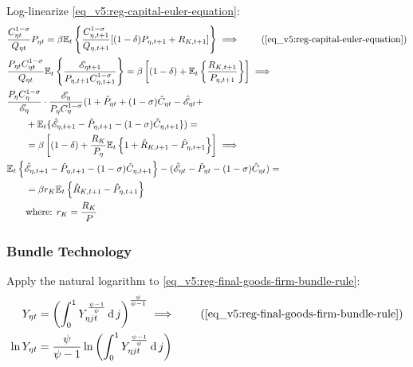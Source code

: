 \documentclass[../thesis.tex]{subfiles}
\begin{document}
Log-linearize \ref{eq_v5:reg-capital-euler-equation}:
	\begin{alignat}{2}
		& \frac{ C_{\eta t}^{1-\sigma}}{Q_{\eta t}} P_{\eta t} = \beta \mathbb{E}_t \left\{ \frac{ C_{\eta, t+1}^{1-\sigma}}{Q_{\eta, t+1}} [(1-\delta) P_{\eta, t+1} + R_{K,t+1}] \right\} \implies \tag{\ref{eq_v5:reg-capital-euler-equation}} \\
		& \frac{P_{\eta t} C_{\eta t}^{1-\sigma}}{Q_{\eta t}} \mathbb{E}_t \left\{ \frac{\te[t+1]}{P_{\eta, t+1} C_{\eta, t+1}^{1-\sigma}} \right\} = \beta \left[ (1-\delta) + \mathbb{E}_t \left\{ \frac{R_{K,t+1}}{P_{\eta, t+1}} \right\} \right] \implies \nonumber \\
		& \frac{P_{\eta} C_{\eta}^{1-\sigma}}{\te[]} \cdot \frac{\te[]}{P_{\eta} C_{\eta}^{1-\sigma}} (1 + \hat{P}_{\eta t} + (1 -\sigma) \hat{C}_{\eta t} - \hat{\mathscr{E}}_{\eta t} + \nonumber \\ 
		& \qquad + \E \{\hat{\mathscr{E}}_{\eta, t+1} - \hat{P}_{\eta, t+1} - (1 -\sigma) \hat{C}_{\eta, t+1}\}) = \nonumber \\
		& \qquad = \beta \left[ (1-\delta) + \frac{R_{K}}{P_{\eta}} \mathbb{E}_t \left\{ 1 + \hat{R}_{K, t+1} -\hat{P}_{\eta, t+1} \right\} \right] \implies \nonumber \\
		& \E \left\{ \hat{\mathscr{E}}_{\eta, t+1} - \hat{P}_{\eta, t+1}  - (1 -\sigma) \hat{C}_{\eta, t+1} \right\} - (\hat{\mathscr{E}}_{\eta t} - \hat{P}_{\eta t} - (1 -\sigma) \hat{C}_{\eta t}) = \nonumber \\
		& \qquad = \beta r_{K} \mathbb{E}_t \left\{ \hat{R}_{K, t+1} - \hat{P}_{\eta, t+1} \right\} \label{eq_v5:reg-ll-capital-euler-equation} \\
		& \qquad \text{where: } r_{K} = \frac{R_{K}}{P_{}} \label{eq_v5:reg-rk}
	\end{alignat}
	

	\subsubsection*{Bundle Technology}

Apply the natural logarithm to \ref{eq_v5:reg-final-goods-firm-bundle-rule}:
\begin{align}
	Y_{\eta t} &= \left( \int_{0}^{1} Y_{\eta jt}^{\frac{\psi-1}{\psi}} \dif j \right)^{\frac{\psi}{\psi-1}} \implies  \tag{\ref{eq_v5:reg-final-goods-firm-bundle-rule}} \\
	\ln{Y_{\eta t}} &= {\frac{\psi}{\psi-1}} \ln{\left( \int_{0}^{1} Y_{\eta jt}^{\frac{\psi-1}{\psi}} \dif j \right)} \nonumber
\end{align}
\end{document}
